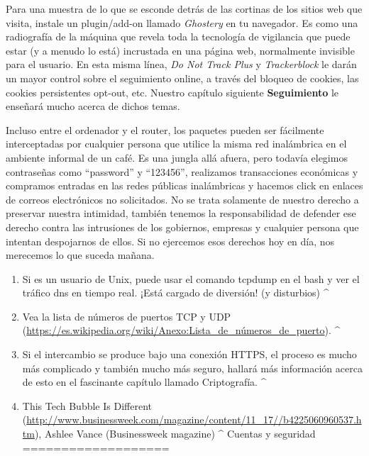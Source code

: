 \documentclass[10pt,a5paper,twoside,,]{book}
\providecommand{\tightlist}{%
  \setlength{\itemsep}{0pt}\setlength{\parskip}{0pt}}
\begin{document}
Para una muestra de lo que se esconde detrás de las cortinas de los
sitios web que visita, instale un plugin/add-on llamado \emph{Ghostery}
en tu navegador. Es como una radiografía de la máquina que revela toda
la tecnología de vigilancia que puede estar (y a menudo lo está)
incrustada en una página web, normalmente invisible para el usuario. En
esta misma línea, \emph{Do Not Track Plus} y \emph{Trackerblock} le
darán un mayor control sobre el seguimiento online, a través del bloqueo
de cookies, las cookies persistentes opt-out, etc. Nuestro capítulo
siguiente \textbf{Seguimiento} le enseñará mucho acerca de dichos temas.

Incluso entre el ordenador y el router, los paquetes pueden ser
fácilmente interceptadas por cualquier persona que utilice la misma red
inalámbrica en el ambiente informal de un café. Es una jungla allá
afuera, pero todavía elegimos contraseñas como ``password'' y
``123456'', realizamos transacciones económicas y compramos entradas en
las redes públicas inalámbricas y hacemos click en enlaces de correos
electrónicos no solicitados. No se trata solamente de nuestro derecho a
preservar nuestra intimidad, también tenemos la responsabilidad de
defender ese derecho contra las intrusiones de los gobiernos, empresas y
cualquier persona que intentan despojarnos de ellos. Si no ejercemos
esos derechos hoy en día, nos merecemos lo que suceda mañana.

\begin{enumerate}
\def\labelenumi{\arabic{enumi}.}
\tightlist
\item
  Si es un usuario de Unix, puede usar el comando tcpdump en el bash y
  ver el tráfico dns en tiempo real. ¡Está cargado de diversión! (y
  disturbios) \^{}
\item
  Vea la lista de números de puertos TCP y UDP
  (\url{https://es.wikipedia.org/wiki/Anexo:Lista_de_números_de_puerto}).
  \^{}
\item
  Si el intercambio se produce bajo una conexión HTTPS, el proceso es
  mucho más complicado y también mucho más seguro, hallará más
  información acerca de esto en el fascinante capítulo llamado
  Criptografía. \^{}
\item
  This Tech Bubble Is Different
  (\href{http://www.businessweek.com/magazine/content/11_17/b4225060960537.htm}{http://www.businessweek.com/magazine/content/11\_17//b4225060960537.htm}),
  Ashlee Vance (Businessweek magazine) \^{} Cuentas y seguridad
  ===================
\end{enumerate}
\end{document}
